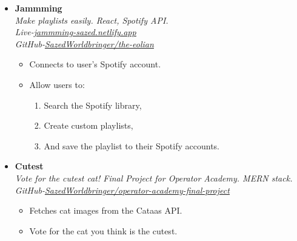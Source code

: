 \documentclass[11pt, oneside, a4paper, titlepage]{article}
\newcommand\experienceVSpace{\vspace{-0.1cm}}
\begin{document}
\begin{tcolorbox}
\begin{minipage}[t]{11cm}
\begin{tcolorbox}[grow to right by=0.75cm,colframe=white,colback=white]
\begin{itemize}
        \item
        {
          \textbf{Jammming} \\
          \textit{Make playlists easily. React, Spotify API.} \\
          \textit{Live-\href{https://jammming-sazed.netlify.app}{\underline{jammming-sazed.netlify.app}} \\ GitHub-\href{https://github.com/SazedWorldbringer/the-eolian}{\underline{SazedWorldbringer/the-eolian}}} \\
          \vspace*{-0.7cm}
          \begin{itemize}
            \item Connects to user's Spotify account.
              \experienceVSpace
            \item {Allow users to:
                \vspace{-0.2cm}
                \begin{enumerate} 
                  \item{Search the Spotify library,}
                    \vspace{-0.2cm}
                  \item{Create custom playlists,} 
                    \vspace{-0.2cm}
                  \item{And save the playlist to their Spotify accounts.}
                \end{enumerate}
              }
          \end{itemize}
        }

        \item
        {
          \textbf{Cutest} \\
          \textit{Vote for the cutest cat! Final Project for Operator Academy. MERN stack.} \\
          \textit{GitHub-\href{https://github.com/SazedWorldbringer/operator-academy-final-project}{\underline{SazedWorldbringer/operator-academy-final-project}}} \\
          \vspace*{-0.7cm}
          \begin{itemize}
            \item Fetches cat images from the Cataas API.
              \experienceVSpace
            \item Vote for the cat you think is the cutest.
          \end{itemize}
        }


\end{itemize}
\end{tcolorbox}
\end{minipage}
\end{tcolorbox}
\end{document}
